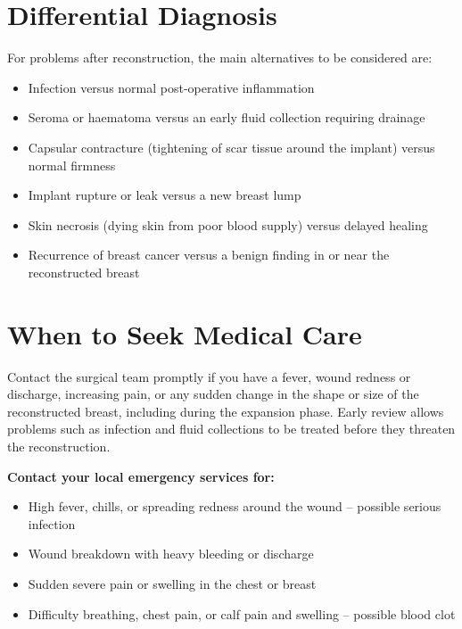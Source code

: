 \section*{Differential Diagnosis}
For problems after reconstruction, the main alternatives to be considered are:

\begin{itemize}
    \item Infection versus normal post-operative inflammation
    \item Seroma or haematoma versus an early fluid collection requiring drainage
    \item Capsular contracture (tightening of scar tissue around the implant) versus normal firmness
    \item Implant rupture or leak versus a new breast lump
    \item Skin necrosis (dying skin from poor blood supply) versus delayed healing
    \item Recurrence of breast cancer versus a benign finding in or near the reconstructed breast
\end{itemize}

\section*{When to Seek Medical Care}
Contact the surgical team promptly if you have a fever, wound redness or discharge, increasing pain, or any sudden change in the shape or size of the reconstructed breast, including during the expansion phase. Early review allows problems such as infection and fluid collections to be treated before they threaten the reconstruction.

\textbf{Contact your local emergency services for:}
\begin{itemize}
    \item High fever, chills, or spreading redness around the wound -- possible serious infection
    \item Wound breakdown with heavy bleeding or discharge
    \item Sudden severe pain or swelling in the chest or breast
    \item Difficulty breathing, chest pain, or calf pain and swelling -- possible blood clot
\end{itemize}

